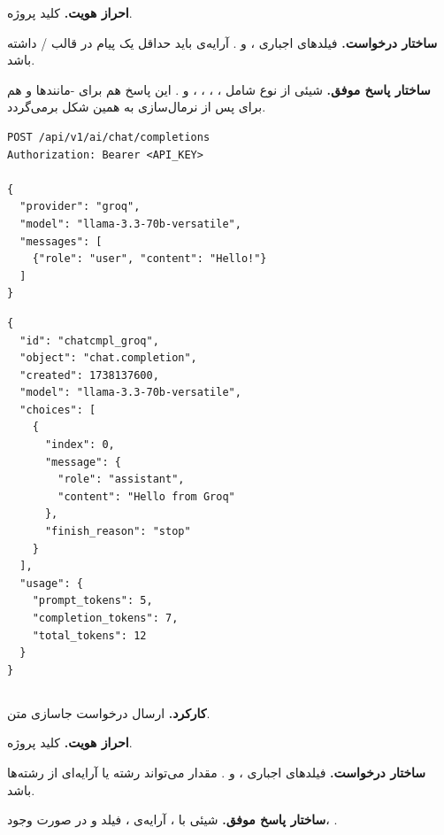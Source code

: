 \textbf{احراز هویت.} کلید پروژه.

\textbf{ساختار درخواست.} فیلدهای اجباری ،  و
. آرایه‌ی  باید حداقل یک پیام در قالب
/ داشته باشد.

\textbf{ساختار پاسخ موفق.} شیئی از نوع  شامل
، ، ، ،  و
. این پاسخ هم برای -مانندها و هم برای 
پس از نرمال‌سازی به همین شکل برمی‌گردد.

\begin{latin}
\begin{lstlisting}[style=jsonStyle]
POST /api/v1/ai/chat/completions
Authorization: Bearer <API_KEY>

{
  "provider": "groq",
  "model": "llama-3.3-70b-versatile",
  "messages": [
    {"role": "user", "content": "Hello!"}
  ]
}
\end{lstlisting}
\end{latin}


\begin{latin}
\begin{lstlisting}[style=jsonStyle]
{
  "id": "chatcmpl_groq",
  "object": "chat.completion",
  "created": 1738137600,
  "model": "llama-3.3-70b-versatile",
  "choices": [
    {
      "index": 0,
      "message": {
        "role": "assistant",
        "content": "Hello from Groq"
      },
      "finish_reason": "stop"
    }
  ],
  "usage": {
    "prompt_tokens": 5,
    "completion_tokens": 7,
    "total_tokens": 12
  }
}
\end{lstlisting}
\end{latin}


\subsection{}
\textbf{کارکرد.} ارسال درخواست جاسازی متن.

\textbf{احراز هویت.} کلید پروژه.

\textbf{ساختار درخواست.} فیلدهای اجباری ،  و
. مقدار  می‌تواند رشته یا آرایه‌ای از رشته‌ها باشد.

\textbf{ساختار پاسخ موفق.} شیئی با ، آرایه‌ی ،
فیلد  و در صورت وجود، .

